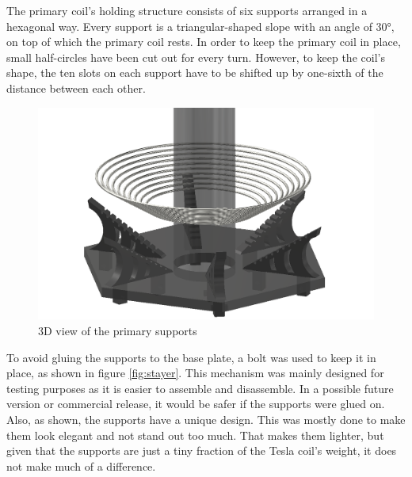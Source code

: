 The primary coil's holding structure consists of six supports arranged in a hexagonal way. Every support is a triangular-shaped slope with an angle of 30°, on top of which the primary coil rests. In order to keep the primary coil in place, small half-circles have been cut out for every turn. However, to keep the coil's shape, the ten slots on each support have to be shifted up by one-sixth of the distance between each other.

\begin{figure}[h!]
    \centering
    \includegraphics[width=1\textwidth]{kassandra/resources/endeMeinerHoffnung.png}
    \caption{3D view of the primary supports}
    \label{fig:primary-supports}
\end{figure}

To avoid gluing the supports to the base plate, a bolt was used to keep it in place, as shown in figure \ref{fig:stayer}. This mechanism was mainly designed for testing purposes as it is easier to assemble and disassemble. In a possible future version or commercial release, it would be safer if the supports were glued on. Also, as shown, the supports have a unique design. This was mostly done to make them look elegant and not stand out too much. That makes them lighter, but given that the supports are just a tiny fraction of the Tesla coil's weight, it does not make much of a difference.

